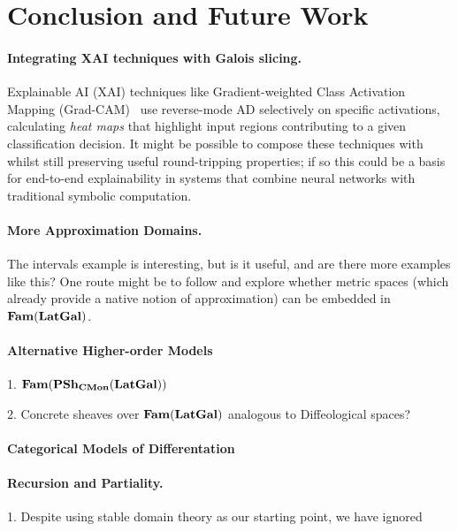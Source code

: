 \section{Conclusion and Future Work}
\label{sec:conclusion}

\paragraph{Integrating XAI techniques with Galois slicing.} 
Explainable AI (XAI) techniques like Gradient-weighted Class Activation Mapping (Grad-CAM)~\cite{selvaraju20}
use reverse-mode AD selectively on specific activations, calculating \emph{heat maps} that highlight input
regions contributing to a given classification decision. It might be possible to compose these techniques with
\GPS whilst still preserving useful round-tripping properties; if so this could be a basis for end-to-end
explainability in systems that combine neural networks with traditional symbolic computation.

\paragraph{More Approximation Domains.} The intervals example is
interesting, but is it useful, and are there more examples like this?
One route might be to follow \cite{edalat-heckmann98} and explore
whether metric spaces (which already provide a native notion of
approximation) can be embedded in $\mathbf{Fam}(\mathbf{LatGal})$.

\paragraph{Alternative Higher-order Models}

1. $\mathbf{Fam}(\mathbf{PSh}_{\mathbf{CMon}}(\mathbf{LatGal}))$

2. Concrete sheaves over $\mathbf{Fam}(\mathbf{LatGal})$ analogous to Diffeological spaces?

\paragraph{Categorical Models of Differentation}

\paragraph{Recursion and Partiality.}
1. Despite using stable domain theory as our starting point, we have ignored


